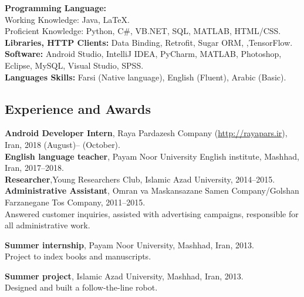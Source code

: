 \documentclass[10pt]{article}
\begin{document}
\noindent \textbf{Programming Language:} \vspace{0.5mm}\\
Working Knowledge: Java,  \LaTeX.\\
Proficient Knowledge:  Python, C\#, VB.NET, SQL, MATLAB, HTML/CSS.\vspace{1mm}\\
\noindent \textbf{Libraries, HTTP Clients:}  Data Binding, Retrofit, Sugar ORM, ,TensorFlow.\vspace{1mm}\\
\noindent \textbf{Software:} Android Studio, IntelliJ IDEA, PyCharm, MATLAB, Photoshop, Eclipse, MySQL, Visual Studio, SPSS.\vspace{1mm}\\
\noindent \textbf{Languages Skills: }Farsi (Native language), English (Fluent), Arabic (Basic).
\subsection*{Experience and Awards}
\textbf {Android Developer Intern}, Raya Pardazesh Company (\url{http://rayapars.ir}), Iran, 2018 (August)-- (October). \vspace{0.5mm}\\
\textbf {English language teacher}, Payam Noor University English institute, Mashhad, Iran, 2017--2018. \vspace{0.5mm}\\
\noindent\textbf {Researcher},Young Researchers Club, Islamic Azad University, 2014--2015. \vspace{0.5mm}\\
\noindent\textbf{Administrative Assistant}, Omran va Maskansazane Samen Company/Golshan Farzanegane Tos Company, 2011--2015. \\
\indent Answered customer inquiries, assisted with advertising campaigns, responsible for all administrative work. \vspace{0.5mm}

\noindent\textbf{Summer internship}, Payam Noor University, Mashhad, Iran, 2013.\\
\indent Project to index books and manuscripts. \vspace{0.5mm}

\noindent\textbf{Summer project}, Islamic Azad University, Mashhad, Iran, 2013.\\
\indent Designed and built a follow-the-line robot. \vspace{0.5mm}
\end{document}
